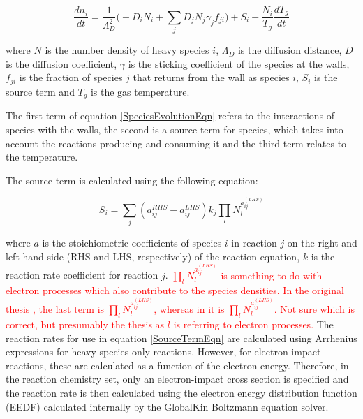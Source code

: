\documentclass[11pt, oneside]{article}   	%
\begin{document}
\begin{equation}
\frac{dn_i}{dt} = \frac{1}{\Lambda_D^2}\bigg(-D_iN_i + \sum_jD_jN_j\gamma_jf_{ji}\bigg) + S_i - \frac{N_i}{T_g}\frac{dT_g}{dt}
\label{SpeciesEvolutionEqn}
\end{equation}

where $N$ is the number density of heavy species $i$, $\Lambda_D$ is the diffusion distance, $D$ is the diffusion coefficient, $\gamma$ is the sticking coefficient of the species at the walls, $f_{ji}$ is the fraction of species $j$ that returns from the wall as species $i$, $S_i$ is the source term and $T_g$ is the gas temperature.

The first term of equation \ref{SpeciesEvolutionEqn} refers to the interactions of species with the walls, the second is a source term for species, which takes into account the reactions producing and consuming it and the third term relates to the temperature.

The source term is calculated using the following equation:

\begin{equation}
S_i = \sum_j(a_{ij}^{RHS}-a_{ij}^{LHS})k_j\prod_lN_l^{a_{ij}^{(LHS)}}
\label{SourceTermEqn}
\end{equation}

where $a$ is the stoichiometric coefficients of species $i$ in reaction $j$ on the right and left hand side (RHS and LHS, respectively) of the reaction equation, $k$ is the reaction rate coefficient for reaction $j$.
\textcolor{red}{ $\prod_lN_l^{a_{ij}^{(LHS)}}$ is something to do with electron processes which also contribute to the species densities. 
In the original thesis \cite{Dorai2002modeling}, the last term is $\prod_lN_l^{a_{lj}^{(LHS)}}$, whereas in \cite{Stafford2004O2} it is $\prod_lN_l^{a_{ij}^{(LHS)}}$. 
Not sure which is correct, but presumably the thesis as $l$ is referring to electron processes.}
The reaction rates for use in equation \ref{SourceTermEqn} are calculated using Arrhenius expressions for heavy species only reactions. 
However, for electron-impact reactions, these are calculated as a function of the electron energy.
Therefore, in the reaction chemistry set, only an electron-impact cross section is specified and the reaction rate is then calculated using the electron energy distribution function (EEDF) calculated internally by the GlobalKin Boltzmann equation solver.
\end{document}
